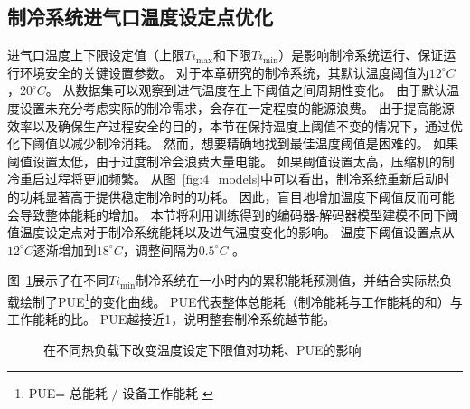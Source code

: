 \subsection{制冷系统进气口温度设定点优化}
进气口温度上下限设定值（上限$Ti_{\max}$和下限$Ti_{\min}$）是影响制冷系统运行、保证运行环境安全的关键设置参数。
对于本章研究的制冷系统，其默认温度阈值为$12^\circ C$，$20^\circ C$。
从数据集可以观察到进气温度在上下阈值之间周期性变化。
由于默认温度设置未充分考虑实际的制冷需求，会存在一定程度的能源浪费。
出于提高能源效率以及确保生产过程安全的目的，本节在保持温度上阈值不变的情况下，通过优化下阈值以减少制冷消耗。
然而，想要精确地找到最佳温度阈值是困难的。
如果阈值设置太低，由于过度制冷会浪费大量电能。
如果阈值设置太高，压缩机的制冷重启过程将更加频繁。
从图~\ref{fig:4_models}中可以看出，制冷系统重新启动时的功耗显著高于提供稳定制冷时的功耗。
因此，盲目地增加温度下阈值反而可能会导致整体能耗的增加。
本节将利用训练得到的编码器-解码器模型建模不同下阈值温度设定点对于制冷系统能耗以及进气温度变化的影响。
温度下阈值设置点从$12^{\circ}C$逐渐增加到$18^{\circ}C$，调整间隔为$0.5^{\circ}C$ 。

图~\ref{fig:4_temperature}展示了在不同$Ti_{\min}$制冷系统在一小时内的累积能耗预测值，并结合实际热负载绘制了PUE\footnote{PUE\text{ }=${\text {  总能耗 }}/{\text { 设备工作能耗 }}$\cite{song2015data}}的变化曲线。
PUE代表整体总能耗（制冷能耗与工作能耗的和）与工作能耗的比。
PUE越接近1，说明整套制冷系统越节能。
\begin{figure}[h]
    \centering
    \caption{在不同热负载下改变温度设定下限值对功耗、PUE的影响}
    \label{fig:4_temperature}
\end{figure}

